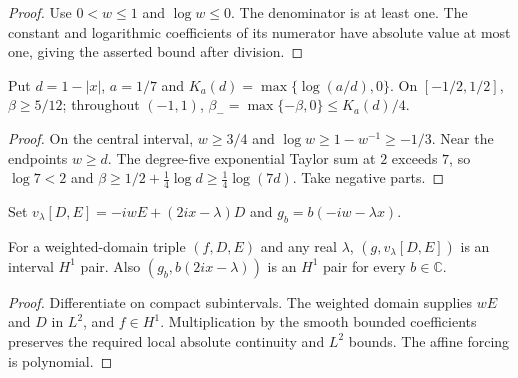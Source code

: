 \begin{proof}
\leanok
Use $0<w\le1$ and $\log w\le0$. The denominator is at least one.
The constant and logarithmic coefficients of its numerator have absolute
value at most one, giving the asserted bound after division.
\end{proof}

\begin{lemma}
\label{lem:beta-central-tail}
\leanok
Put $d=1-|x|$, $a=1/7$ and $K_a(d)=\max\{\log(a/d),0\}$.
On $[-1/2,1/2]$, $\beta\ge5/12$; throughout $(-1,1)$,
$\beta_-=\max\{-\beta,0\}\le K_a(d)/4$.
\end{lemma}

\begin{proof}
\leanok
On the central interval, $w\ge3/4$ and
$\log w\ge1-w^{-1}\ge-1/3$. Near the endpoints $w\ge d$.
The degree-five exponential Taylor sum at $2$ exceeds $7$, so
$\log7<2$ and
$\beta\ge1/2+\tfrac14\log d\ge\tfrac14\log(7d)$.
Take negative parts.
\end{proof}

\begin{definition}
\label{def:corrected-forcing-derivative}
\leanok
Set $v_\lambda[D,E]=-iwE+(2ix-\lambda)D$ and
$g_b=b(-iw-\lambda x)$.
\end{definition}

\begin{lemma}
\label{lem:corrected-forcing-h1}
\leanok
For a weighted-domain triple $(f,D,E)$ and any real $\lambda$,
$(g,v_\lambda[D,E])$ is an interval $H^1$ pair.
Also $(g_b,b(2ix-\lambda))$ is an $H^1$ pair for every $b\in\mathbb C$.
\end{lemma}

\begin{proof}
\leanok
Differentiate on compact subintervals. The weighted domain supplies $wE$
and $D$ in $L^2$, and $f\in H^1$. Multiplication by the smooth bounded
coefficients preserves the required local absolute continuity and $L^2$
bounds. The affine forcing is polynomial.
\end{proof}

